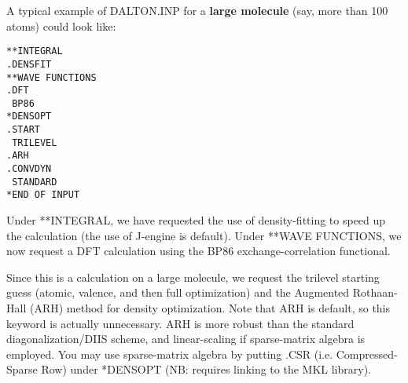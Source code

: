 A typical example of DALTON.INP for a {\bf large molecule} (say, more than 100 atoms) could look like: 
\begin{verbatim}
**INTEGRAL
.DENSFIT
**WAVE FUNCTIONS
.DFT
 BP86
*DENSOPT
.START
 TRILEVEL
.ARH
.CONVDYN
 STANDARD
*END OF INPUT
\end{verbatim}
Under **INTEGRAL, we have requested the use of density-fitting to speed up the calculation (the use of J-engine is default). 
Under **WAVE FUNCTIONS, we now request a DFT
calculation using the BP86 exchange-correlation functional.

Since this is a calculation on a large molecule, 
we request the trilevel starting guess (atomic, valence, and then full
optimization) and the Augmented Rothaan-Hall (ARH) method for density optimization. 
Note that ARH is default, so this keyword is actually unnecessary.
ARH is more robust than the standard diagonalization/DIIS scheme, and linear-scaling if sparse-matrix algebra is employed. You may use
sparse-matrix algebra by putting .CSR (i.e. Compressed-Sparse Row) under *DENSOPT (NB: requires linking to the MKL library). 

